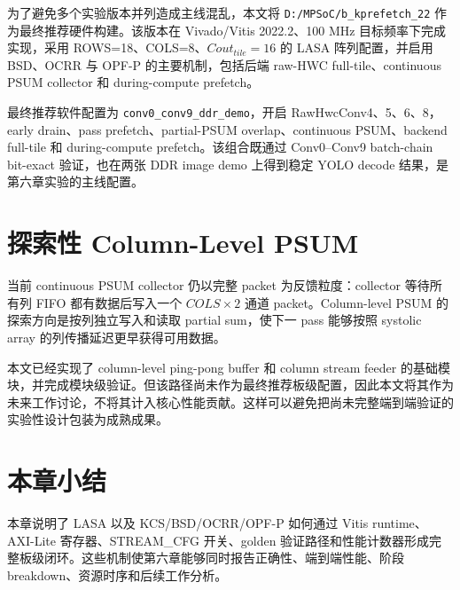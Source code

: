 为了避免多个实验版本并列造成主线混乱，本文将 \texttt{D:/MPSoC/b\_kprefetch\_22} 作为最终推荐硬件构建。该版本在 Vivado/Vitis 2022.2、100 MHz 目标频率下完成实现，采用 ROWS=18、COLS=8、$Cout_{tile}=16$ 的 LASA 阵列配置，并启用 BSD、OCRR 与 OPF-P 的主要机制，包括后端 raw-HWC full-tile、continuous PSUM collector 和 during-compute prefetch。

最终推荐软件配置为 \texttt{conv0\_conv9\_ddr\_demo}，开启 RawHwcConv4、5、6、8，early drain、pass prefetch、partial-PSUM overlap、continuous PSUM、backend full-tile 和 during-compute prefetch。该组合既通过 Conv0--Conv9 batch-chain bit-exact 验证，也在两张 DDR image demo 上得到稳定 YOLO decode 结果，是第六章实验的主线配置。

\section{探索性 Column-Level PSUM}

当前 continuous PSUM collector 仍以完整 packet 为反馈粒度：collector 等待所有列 FIFO 都有数据后写入一个 $COLS\times2$ 通道 packet。Column-level PSUM 的探索方向是按列独立写入和读取 partial sum，使下一 pass 能够按照 systolic array 的列传播延迟更早获得可用数据。

本文已经实现了 column-level ping-pong buffer 和 column stream feeder 的基础模块，并完成模块级验证。但该路径尚未作为最终推荐板级配置，因此本文将其作为未来工作讨论，不将其计入核心性能贡献。这样可以避免把尚未完整端到端验证的实验性设计包装为成熟成果。

\section{本章小结}

本章说明了 LASA 以及 KCS/BSD/OCRR/OPF-P 如何通过 Vitis runtime、AXI-Lite 寄存器、STREAM\_CFG 开关、golden 验证路径和性能计数器形成完整板级闭环。这些机制使第六章能够同时报告正确性、端到端性能、阶段 breakdown、资源时序和后续工作分析。
